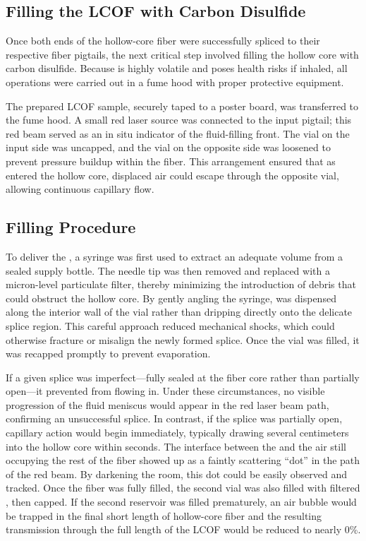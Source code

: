 \subsection{Filling the \acs{LCOF} with Carbon Disulfide}
\label{subsec:Cooling:Filling with CS2}

Once both ends of the hollow-core fiber were successfully spliced to their respective fiber pigtails, the next critical step involved filling the hollow core with carbon disulfide. Because  is highly volatile and poses health risks if inhaled, all operations were carried out in a fume hood with proper protective equipment.

The prepared \ac{LCOF} sample, securely taped to a poster board, was transferred to the fume hood. A small red laser source was connected to the input pigtail; this red beam served as an in situ indicator of the fluid-filling front. The vial on the input side was uncapped, and the vial on the opposite side was loosened to prevent pressure buildup within the fiber. This arrangement ensured that as  entered the hollow core, displaced air could escape through the opposite vial, allowing continuous capillary flow.

\subsection{Filling Procedure}

To deliver the , a syringe was first used to extract an adequate volume from a sealed supply bottle. The needle tip was then removed and replaced with a micron-level particulate filter, thereby minimizing the introduction of debris that could obstruct the hollow core. By gently angling the syringe,  was dispensed along the interior wall of the vial rather than dripping directly onto the delicate splice region. This careful approach reduced mechanical shocks, which could otherwise fracture or misalign the newly formed splice. Once the vial was filled, it was recapped promptly to prevent evaporation.

If a given splice was imperfect—fully sealed at the fiber core rather than partially open—it prevented  from flowing in. Under these circumstances, no visible progression of the fluid meniscus would appear in the red laser beam path, confirming an unsuccessful splice. In contrast, if the splice was partially open, capillary action would begin immediately, typically drawing  several centimeters into the hollow core within seconds. The interface between the  and the air still occupying the rest of the fiber showed up as a faintly scattering “dot” in the path of the red beam. By darkening the room, this dot could be easily observed and tracked. Once the fiber was fully filled, the second vial was also filled with filtered , then capped. If the second reservoir was filled prematurely, an air bubble would be trapped in the final short length of hollow-core fiber and the resulting transmission through the full length of the \ac{LCOF} would be reduced to nearly 0\%.

